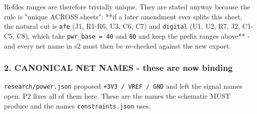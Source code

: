 \documentclass[11pt,a4paper]{article}
\begin{document}
Refdes ranges are therefore trivially unique. They are stated anyway because the rule is "unique ACROSS sheets": {*}{*}if a later amendment ever splits this sheet, the natural cut is \texttt{afe} (J1, R1-R6, U3, C6, C7) and \texttt{digital} (U1, U2, R7, J2, C1-C5, C8), which take \texttt{pwr\_base = 40} and \texttt{80} and keep the prefix ranges above{*}{*} - and every net name in s2 must then be re-checked against the new export.

\subsubsection*{2. CANONICAL NET NAMES - these are now binding}
\texttt{research/power.json} proposed \texttt{+3V3 / VREF / GND} and left the signal names open. P2 fixes all of them here. These are the names the schematic MUST produce and the names \texttt{constraints.json} uses.
\end{document}

